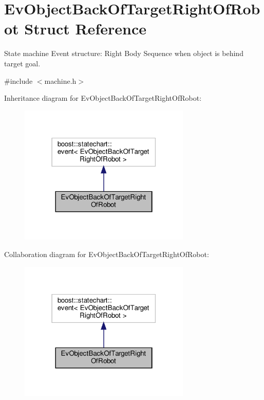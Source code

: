 \hypertarget{structEvObjectBackOfTargetRightOfRobot}{}\section{Ev\+Object\+Back\+Of\+Target\+Right\+Of\+Robot Struct Reference}
\label{structEvObjectBackOfTargetRightOfRobot}


State machine Event structure\+: Right Body Sequence when object is behind target goal.  




{\ttfamily \#include $<$machine.\+h$>$}



Inheritance diagram for Ev\+Object\+Back\+Of\+Target\+Right\+Of\+Robot\+:
\nopagebreak
\begin{figure}[H]
\begin{center}
\leavevmode
\includegraphics[width=231pt]{structEvObjectBackOfTargetRightOfRobot__inherit__graph}
\end{center}
\end{figure}


Collaboration diagram for Ev\+Object\+Back\+Of\+Target\+Right\+Of\+Robot\+:
\nopagebreak
\begin{figure}[H]
\begin{center}
\leavevmode
\includegraphics[width=231pt]{structEvObjectBackOfTargetRightOfRobot__coll__graph}
\end{center}
\end{figure}


